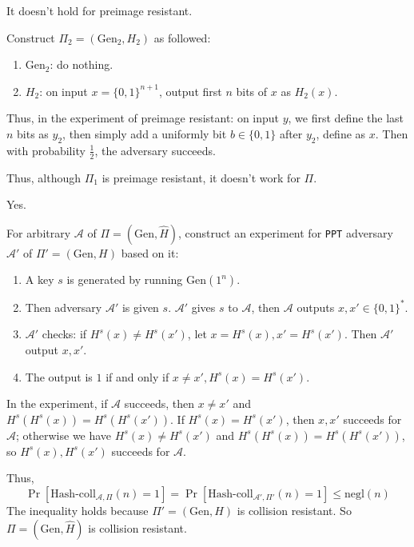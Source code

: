 \documentclass[a4paper]{article}
\newcommand{\negl}{\text{negl}}
\newcommand{\Gen}{\text{Gen}}
\newcommand{\hashcoll}{\text{Hash-coll}}
\newcommand{\A}{\mathcal{A}}
\newenvironment{problem}[2][Problem]{\begin{trivlist}
\item[\hskip \labelsep {\bfseries #1}\hskip \labelsep {\bfseries #2.}]}{\end{trivlist}}
\begin{document}
\begin{problem}{5.2}
It doesn't hold for preimage resistant.\par
Construct $\Pi_2=(\Gen_2,H_2)$ as followed:
\begin{enumerate}
    \item $\Gen_2$: do nothing.
    \item $H_2$: on input $x=\{0,1\}^{n+1}$, output first $n$ bits of $x$ as $H_2(x)$.
\end{enumerate}
Thus, in the experiment of preimage resistant: on input $y$, we first define the last $n$ bits as $y_2$, then simply add a uniformly bit $b\in\{0,1\}$ after $y_2$, define as $x$. Then with probability $\frac12$, the adversary succeeds. \par
Thus, although $\Pi_1$ is preimage resistant, it doesn't work for $\Pi$.
\end{problem}
\begin{problem}{5.3}
Yes.\par
For arbitrary $\A$ of $\Pi=(\Gen,\hat{H})$, construct an experiment for \texttt{PPT} adversary $\A'$ of $\Pi'=(\Gen,H)$ based on it:\begin{enumerate}
    \item A key $s$ is generated by running $\Gen(1^n)$.
    \item Then adversary $\A'$ is given $s$. $\A'$ gives $s$ to $\A$, then $\A$ outputs $x,x'\in\{0,1\}^{*}$.
    \item $\A'$ checks: if $H^s(x)\ne H^s(x')$, let $x=H^s(x), x'=H^s(x')$. Then $\A'$ output $x,x'$.
    \item The output is $1$ if and only if $x\ne x',H^{s}(x)=H^{s}(x')$.
\end{enumerate}
In the experiment, if $\A$ succeeds, then $x\ne x'$ and $H^{s}(H^{s}(x))=H^{s}(H^{s}(x'))$. If $H^{s}(x)=H^{s}(x')$, then $x, x'$ succeeds for $\A$; otherwise we have $H^{s}(x)\ne H^{s}(x')$ and $H^{s}(H^{s}(x))=H^{s}(H^{s}(x'))$, so $H^{s}(x),H^{s}(x')$ succeeds for $\A$. \par
Thus,\[\Pr[\hashcoll_{\A,\Pi}(n)=1]=\Pr[\hashcoll_{\A',\Pi'}(n)=1]\le\negl(n)\]
The inequality holds because $\Pi'=(\Gen,H)$ is collision resistant. So $\Pi=(\Gen,\hat{H})$ is collision resistant.
\end{problem}
\end{document}
